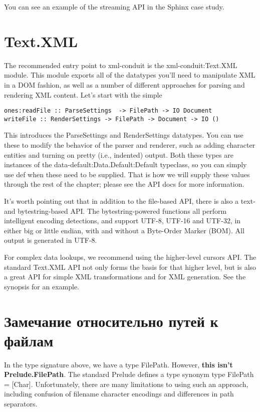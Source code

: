 \begin{remark}
You can see an example of the streaming API in the Sphinx case study.
\end{remark}

\section{Text.XML}

The recommended entry point to xml-conduit is the xml-conduit:Text.XML module. This module exports all of the datatypes you'll need to manipulate XML in a DOM fashion, as well as a number of different approaches for parsing and rendering XML content. Let's start with the simple

\begin{lstlisting}
ones:readFile :: ParseSettings  -> FilePath -> IO Document
writeFile :: RenderSettings -> FilePath -> Document -> IO ()
\end{lstlisting}

This introduces the ParseSettings and RenderSettings datatypes. You can use these to modify the behavior of the parser and renderer, such as adding character entities and turning on pretty (i.e., indented) output. Both these types are instances of the data-default:Data.Default:Default typeclass, so you can simply use def when these need to be supplied. That is how we will supply these values through the rest of the chapter; please see the API docs for more information.

It's worth pointing out that in addition to the file-based API, there is also a text- and bytestring-based API. The bytestring-powered functions all perform intelligent encoding detections, and support UTF-8, UTF-16 and UTF-32, in either big or little endian, with and without a Byte-Order Marker (BOM). All output is generated in UTF-8.

For complex data lookups, we recommend using the higher-level cursors API. The standard Text.XML API not only forms the basis for that higher level, but is also a great API for simple XML transformations and for XML generation. See the synopsis for an example.

\section{Замечание относительно путей к файлам} %

In the type signature above, we have a type FilePath. However, {\bf this isn't Prelude.FilePath}. The standard Prelude defines a type synonym type FilePath = [Char]. Unfortunately, there are many limitations to using such an approach, including confusion of filename character encodings and differences in path separators.

